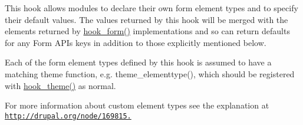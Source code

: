 This hook allows modules to declare their own form element types and to specify their default values. The values returned by this hook will be merged with the elements returned by \hyperlink{group__node__api__hooks_ga52618ef4643a60878dd5a76ff9bbff30}{hook\_\-form()} implementations and so can return defaults for any Form APIs keys in addition to those explicitly mentioned below.

Each of the form element types defined by this hook is assumed to have a matching theme function, e.g. theme\_\-elementtype(), which should be registered with \hyperlink{group__hooks_ga013ccb45c7aaab1c16cf9691428c910d}{hook\_\-theme()} as normal.

For more information about custom element types see the explanation at \href{http://drupal.org/node/169815.}{\tt http://drupal.org/node/169815.}

